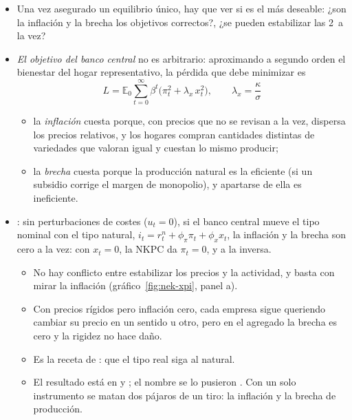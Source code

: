 \documentclass[11pt]{article}
\begin{document}
\begin{itemize}
\item Una vez asegurado un equilibrio único, hay que ver si es el más deseable: ¿son la inflación y la brecha los objetivos correctos?, ¿se pueden estabilizar las 2~a la vez?
\item \emph{El objetivo del banco central} no es arbitrario: aproximando a segundo orden el bienestar del hogar representativo, la pérdida que debe minimizar es\nocite{RotembergWoodford1997Optimization,Woodford2003Interest}
  \begin{equation}
  L=\mathbb{E}_0\sum_{t=0}^{\infty}\beta^t\big(\pi_t^2+\lambda_x\,x_t^2\big),\qquad \lambda_x=\frac{\kappa}{\sigma} \label{eq:perdida}
  \end{equation}
  \begin{itemize}
  \item la \emph{inflación} cuesta porque, con precios que no se revisan a la vez, dispersa los precios relativos, y los hogares compran cantidades distintas de variedades que valoran igual y cuestan lo mismo producir;
  \item la \emph{brecha} cuesta porque la producción natural es la eficiente (si un subsidio corrige el margen de monopolio), y apartarse de ella es ineficiente.
  \end{itemize}
\item {}: sin perturbaciones de costes ($u_t=0$), si el banco central mueve el tipo nominal con el tipo natural, $i_t=r^n_t+\phi_\pi\pi_t+\phi_x x_t$, la inflación y la brecha son cero a la vez: con $x_t=0$, la NKPC da $\pi_t=0$, y a la inversa.
  \begin{itemize}
  \item No hay conflicto entre estabilizar los precios y la actividad, y basta con mirar la inflación (gráfico~\ref{fig:nek-xpi}, panel a).
  \item Con precios rígidos pero inflación cero, cada empresa sigue queriendo cambiar su precio en un sentido u otro, pero en el agregado la brecha es cero y la rigidez no hace daño.
  \item Es la receta de : que el tipo real siga al natural.
  \item El resultado está en \textcite{GoodfriendKing1997New} y \textcite{RotembergWoodford1997Optimization}; el nombre se lo pusieron \textcite{BlanchardGali2007Real}. Con un solo instrumento se matan dos pájaros de un tiro: la inflación y la brecha de producción.
  \end{itemize}

\end{itemize}
\end{document}
